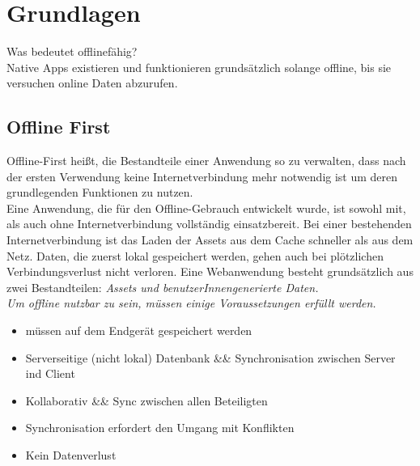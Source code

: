 \chapter{\label{chap:grundlagen}Grundlagen}
Was bedeutet offlinefähig?\\
Native \Glspl{App} existieren und funktionieren grundsätzlich solange offline, bis sie versuchen online Daten abzurufen.
%
%
\section{Offline First}
Offline-First heißt, die Bestandteile einer Anwendung so zu verwalten, dass nach der ersten Verwendung keine Internetverbindung mehr notwendig ist um deren grundlegenden Funktionen zu nutzen.\\
Eine Anwendung, die für den Offline-Gebrauch entwickelt wurde, ist sowohl mit, als auch ohne Internetverbindung vollständig einsatzbereit. Bei einer bestehenden Internetverbindung ist das Laden der \gls{Assets} aus dem Cache schneller als aus dem Netz. Daten, die zuerst lokal gespeichert werden, gehen auch bei plötzlichen Verbindungsverlust nicht verloren.
%
%
Eine Webanwendung besteht grundsätzlich aus zwei Bestandteilen: \it{\gls{Assets}} und benutzerInnengenerierte Daten.\\
Um offline nutzbar zu sein, müssen einige Voraussetzungen erfüllt werden.
\begin{itemize}
  \item müssen auf dem Endgerät gespeichert werden
  \item Serverseitige (nicht lokal) Datenbank \&\& Synchronisation zwischen Server ind Client
  \item Kollaborativ \&\& Sync zwischen allen Beteiligten
  \item Synchronisation erfordert den Umgang mit Konflikten
  \item Kein Datenverlust
\end{itemize}

